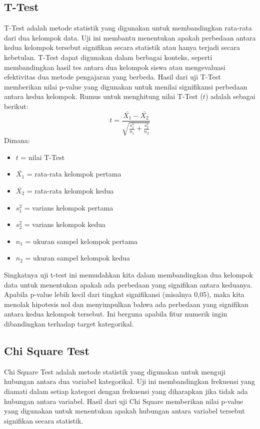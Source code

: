 \subsection{T-Test}
T-Test adalah metode statistik yang digunakan untuk membandingkan rata-rata dari dua kelompok data. Uji ini membantu menentukan apakah perbedaan antara kedua kelompok tersebut signifikan secara statistik atau hanya terjadi secara kebetulan. T-Test dapat digunakan dalam berbagai konteks, seperti membandingkan hasil tes antara dua kelompok siswa atau mengevaluasi efektivitas dua metode pengajaran yang berbeda. Hasil dari uji T-Test memberikan nilai p-value yang digunakan untuk menilai signifikansi perbedaan antara kedua kelompok. 
Rumus untuk menghitung nilai T-Test ($t$) adalah sebagai berikut:
\begin{equation}
    t = \frac{\bar{X_1} - \bar{X_2}}{\sqrt{\frac{s_1^2}{n_1} + \frac{s_2^2}{n_2}}}
\end{equation}
Dimana:
\begin{itemize}
    \item $t$ = nilai T-Test
    \item $\bar{X_1}$ = rata-rata kelompok pertama
    \item $\bar{X_2}$ = rata-rata kelompok kedua
    \item $s_1^2$ = varians kelompok pertama
    \item $s_2^2$ = varians kelompok kedua
    \item $n_1$ = ukuran sampel kelompok pertama
    \item $n_2$ = ukuran sampel kelompok kedua
\end{itemize}

Singkatnya uji t-test ini memudahkan kita dalam membandingkan dua kelompok data untuk menentukan apakah ada perbedaan yang signifikan antara keduanya. Apabila p-value lebih kecil dari tingkat signifikansi (misalnya 0,05), maka kita menolak hipotesis nol dan menyimpulkan bahwa ada perbedaan yang signifikan antara kedua kelompok tersebut. Ini berguna apabila fitur numerik ingin dibandingkan terhadap target kategorikal.


\subsection{Chi Square Test}
Chi Square Test adalah metode statistik yang digunakan untuk menguji hubungan antara dua variabel kategorikal. Uji ini membandingkan frekuensi yang diamati dalam setiap kategori dengan frekuensi yang diharapkan jika tidak ada hubungan antara variabel. Hasil dari uji Chi Square memberikan nilai p-value yang digunakan untuk menentukan apakah hubungan antara variabel tersebut signifikan secara statistik. 

